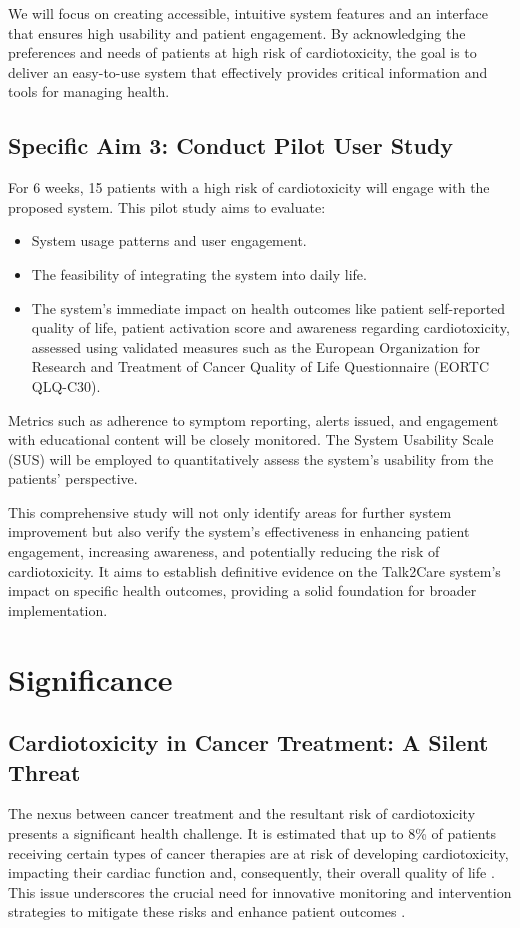 \documentclass[11pt]{article}
\begin{document}
We will focus on creating accessible, intuitive system features and an interface that ensures high usability and patient engagement. By acknowledging the preferences and needs of patients at high risk of cardiotoxicity, the goal is to deliver an easy-to-use system that effectively provides critical information and tools for managing health.

\subsection*{Specific Aim 3: Conduct Pilot User Study} 


For 6 weeks, 15 patients with a high risk of cardiotoxicity will engage with the proposed system. This pilot study aims to evaluate: \begin{itemize}[topsep=0pt,itemsep=0pt,parsep=0pt]
  \item System usage patterns and user engagement. 
  \item The feasibility of integrating the system into daily life. 
  \item The system's immediate impact on health outcomes like patient self-reported quality of life, patient activation score and awareness regarding cardiotoxicity, assessed using validated measures such as the European Organization for Research and Treatment of Cancer Quality of Life Questionnaire (EORTC QLQ-C30). 
\end{itemize} 
Metrics such as adherence to symptom reporting, alerts issued, and engagement with educational content will be closely monitored. The System Usability Scale (SUS) will be employed to quantitatively assess the system's usability from the patients' perspective.

This comprehensive study will not only identify areas for further system improvement but also verify the system's effectiveness in enhancing patient engagement, increasing awareness, and potentially reducing the risk of cardiotoxicity. It aims to establish definitive evidence on the Talk2Care system's impact on specific health outcomes, providing a solid foundation for broader implementation.

\section{Significance}

\subsection{Cardiotoxicity in Cancer Treatment:  A Silent Threat} The nexus between
cancer treatment and the resultant risk of cardiotoxicity presents a significant
health challenge. It is estimated that up to 8\% of patients receiving certain
types of cancer therapies are at risk of developing cardiotoxicity, impacting
their cardiac function and, consequently, their overall quality of life \cite{limaCardiotoxicityCancerPatients2022}. This
issue underscores the crucial need for innovative monitoring and intervention
strategies to mitigate these risks and enhance patient outcomes \cite{alemanCardiovascularDiseaseCancer2014}.
\end{document}

